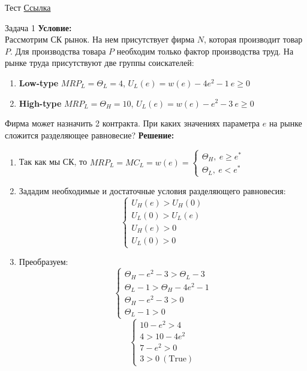\begin{mybox}{Тест}
    \href{https://forms.gle/F2zMM9MwLUfXKEod7}{Ссылка}
\end{mybox}

\begin{mybox}{Задача 1}
\indent\setlength{\parindent}{1em}\textbf{Условие:}\\
\indent\setlength{\parindent}{1em}Рассмотрим СК рынок. На нем присутствует фирма $N$, которая производит товар $P$. Для производства товара $P$ необходим только фактор производства труд. На рынке труда присутствуют две группы соискателей: \begin{enumerate}
    \item \textbf{Low-type} $MRP_L=\Theta_L=4$, $U_L(e)=w(e)-4e^2-1 \ e\geq0$
    \item \textbf{High-type} $MRP_L=\Theta_H=10$, $U_L(e)=w(e)-e^2-3 \ e\geq0$
\end{enumerate}
\indent\setlength{\parindent}{1em}Фирма может назначить 2 контракта. При каких значениях параметра $e$ на рынке сложится разделяющее равновесие?
\tcblower
\textbf{Решение:}
\begin{enumerate}
    \item Так как мы СК, то $MRP_L=MC_L=w(e)=\begin{cases}
        \Theta_H, \ e\geq e^* \\
        \Theta_L, \ e<e^*
    \end{cases}$
    \item Зададим необходимые и достаточные условия разделяющего равновесия: $$\begin{cases}
        U_H(e)>U_H(0) \\
        U_L(0)>U_L(e) \\
        U_H(e)>0 \\
        U_L(0)>0
    \end{cases}$$
    \item Преобразуем: $$\begin{cases}
        \Theta_H-e^2-3>\Theta_L-3 \\
        \Theta_L-1>\Theta_H-4e^2-1 \\
        \Theta_H-e^2-3>0 \\
        \Theta_L-1>0
    \end{cases}$$
    $$\begin{cases}
        10-e^2>4 \\
        4>10-4e^2 \\
        7-e^2>0 \\
        3>0 \ (\text{True})

\end{cases}$$
\end{enumerate}
\end{mybox}
